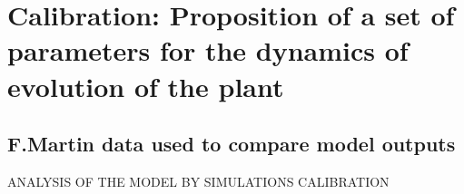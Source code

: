 \documentclass{myBeamer}
\begin{document}
%
%
%
%



\section*{Calibration: Proposition of a set of parameters for the dynamics of evolution of the plant}\label{Calibration}
\subsection*{F.Martin data used to compare model outputs}  \label{Data_Matin}

\begin{frame}{}
\center \huge
ANALYSIS OF THE MODEL BY SIMULATIONS
 \bigbreak \bigbreak
CALIBRATION
\end{frame}



\end{document}

